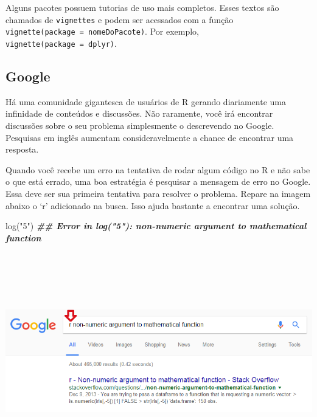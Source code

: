 \documentclass[
]{book}
\newenvironment{Shaded}{\begin{snugshade}}{\end{snugshade}}
\newcommand{\DocumentationTok}[1]{\textcolor[rgb]{0.56,0.35,0.01}{\textbf{\textit{#1}}}}
\newcommand{\FunctionTok}[1]{\textcolor[rgb]{0.00,0.00,0.00}{#1}}
\newcommand{\NormalTok}[1]{#1}
\newcommand{\StringTok}[1]{\textcolor[rgb]{0.31,0.60,0.02}{#1}}
\begin{document}
Alguns pacotes possuem tutorias de uso mais completos. Esses textos são chamados de \texttt{vignettes} e podem ser acessados com a função \texttt{vignette(package\ =\ \textquotesingle{}nomeDoPacote\textquotesingle{})}. Por exemplo, \texttt{vignette(package\ =\ \textquotesingle{}dplyr\textquotesingle{})}.

\hypertarget{google}{%
\subsection{Google}\label{google}}

Há uma comunidade gigantesca de usuários de R gerando diariamente uma infinidade de conteúdos e discussões. Não raramente, você irá encontrar discussões sobre o seu problema simplesmente o descrevendo no Google. Pesquisas em inglês aumentam consideravelmente a chance de encontrar uma resposta.

Quando você recebe um erro na tentativa de rodar algum código no R e não sabe o que está errado, uma boa estratégia é pesquisar a mensagem de erro no Google. Essa deve ser sua primeira tentativa para resolver o problema. Repare na imagem abaixo o `r' adicionado na busca. Isso ajuda bastante a encontrar uma solução.

\begin{Shaded}
\begin{Highlighting}[]
\FunctionTok{log}\NormalTok{(}\StringTok{"5"}\NormalTok{)}
\DocumentationTok{\#\# Error in log("5"): non{-}numeric argument to mathematical function}
\end{Highlighting}
\end{Shaded}

\begin{center}\includegraphics[width=795pt,height=267pt]{assets/img/r-base/ajuda_google} \end{center}
\end{document}
